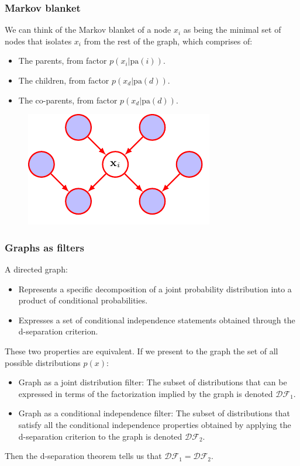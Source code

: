 \documentclass{beamer}
\begin{document}
\begin{frame}
    \frametitle{Markov blanket}
    We can think of the Markov blanket of a node $x_{i}$ as being the minimal set of nodes that isolates $x_{i}$ from the rest of the graph, which comprises of:
    \begin{itemize}
        \item The parents, from factor $p(x_{i}|\mathrm{pa}(i))$.
        \item The children, from factor $p(x_{d}|\mathrm{pa}(d))$.
        \item The co-parents, from factor $p(x_{d}|\mathrm{pa}(d))$.
    \end{itemize}
    \begin{figure}
        \includegraphics{Figure_25.pdf}
    \end{figure}
\end{frame}

\begin{frame}
    \frametitle{Graphs as filters}
    A directed graph:
    \begin{itemize}
        \item Represents a specific decomposition of a joint probability distribution into a product of conditional probabilities.
        \item Expresses a set of conditional independence statements obtained through the d-separation criterion.
    \end{itemize}
    These two properties are equivalent. If we present to the graph the set of all possible distributions $p(x)$:
    \begin{itemize}
        \item Graph as a joint distribution filter: The subset of distributions that can be expressed in terms of the factorization implied by the graph is denoted $\mathcal{DF}_{1}$.
        \item Graph as a conditional independence filter: The subset of distributions that satisfy all the conditional independence properties obtained by applying the d-separation criterion to the graph is denoted $\mathcal{DF}_{2}$.
    \end{itemize}
    Then the d-separation theorem tells us that $\mathcal{DF}_{1}=\mathcal{DF}_{2}$.
\end{frame}
\end{document}
